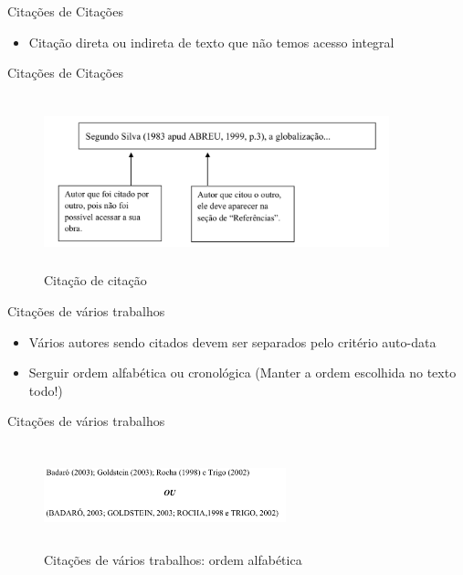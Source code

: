 \begin{frame}	
	\begin{block}{Citações de Citações}	
		\begin{itemize}
			\item Citação direta ou indireta de texto que não temos acesso integral
		\end{itemize}
	\end{block}
\end{frame}

\begin{frame}	
	\begin{block}{Citações de Citações}	
		 \begin{figure}[!htb]
			\centering	  				
			\includegraphics[height=5cm, width = 10cm]{./pic/apud.png}
			\caption{Citação de citação \cite{GUIA_SENAC}}
			\label{fig_citacaodecitacao}
		\end{figure}
	\end{block}
\end{frame}

\begin{frame}	
	\begin{block}{Citações de vários trabalhos}	
		\begin{itemize}
			\item Vários autores sendo citados devem ser separados pelo critério auto-data
			\item Serguir ordem alfabética ou cronológica (Manter a ordem escolhida no texto todo!)
		\end{itemize}
	\end{block}
\end{frame}

\begin{frame}	
	\begin{block}{Citações de vários trabalhos}	
		 \begin{figure}[!htb]
			\centering	  				
			\includegraphics[height=3cm, width = 7cm]{./pic/alfabetica.png}
			\caption{Citações de vários trabalhos: ordem alfabética \cite{GUIA_SENAC}}
			\label{fig_citacaodevariostrabalhos}
		\end{figure}
	\end{block}
	
\end{frame}

